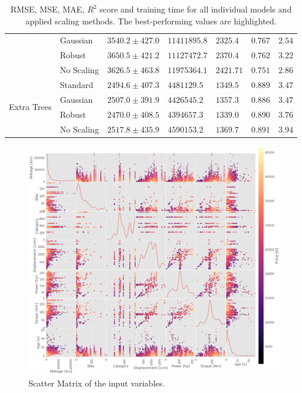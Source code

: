 \begin{table}[h!]
\begin{tabular}{ |p{2cm}||p{2cm}||p{2.9cm}|p{1.9cm}|p{1.7cm}|p{1cm}|p{1.2cm}|  }
        & Gaussian  & $3540.2 \pm  427.0$ & $11411895.8$ & $2325.4$ & $0.767$ & $2.54$\\
        & Robust & $3650.5 \pm 421.2$ & $11127472.7$ & $2370.4$ & $0.762$ & $3.22$\\
        & No Scaling & $3626.5 \pm  463.8$ & $11975364.1$ & $2421.71$ & $0.751$ & $2.86$\\
        \hline   
        \multirow{4}{2cm}{Extra Trees} & Standard & $2494.6 \pm  407.3$ & $4481129.5$ & $1349.5$ & $0.889$ & $3.47$\\
        & Gaussian  & $2507.0 \pm  391.9$ & $4426545.2$ & $1357.3$ & $0.886$ & $3.47$\\
        & \cellcolor[HTML]{FFFACD} Robust & \cellcolor[HTML]{FFFACD} $2470.0 \pm 408.5$ & $4394657.3$ & \cellcolor[HTML]{FFFACD}$1339.0$ & \cellcolor[HTML]{FFFACD}$0.890$ & $3.76$\\
        & No Scaling & $2517.8 \pm  435.9$ & $4590153.2$ & $1369.7$ & $0.891$ & $3.94$\\
        \hline
      \end{tabular}
      \caption{RMSE, MSE, MAE, $R^2$ score and training time for all individual models and applied scaling methods. The best-performing values are highlighted.}
      \label{tab:Metrics}
\end{table}

\begin{figure}
    \centering
        \centering
        \includegraphics[width=\textwidth]{"content/pics/Scatter_Matrix_All.png"}
        \caption{Scatter Matrix of the input variables.}
        \label{fig:}
\end{figure}

